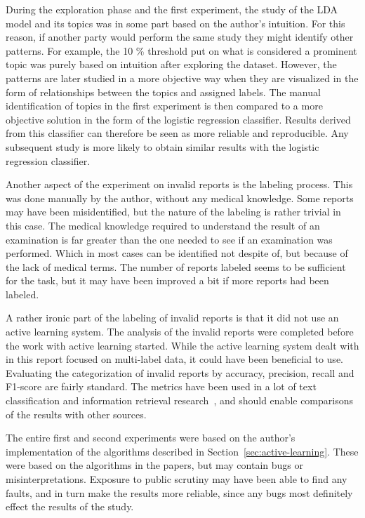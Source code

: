 During the exploration phase and the first experiment, the study of the LDA model and its topics was in some part based on the author's intuition.
For this reason, if another party would perform the same study they might identify other patterns.
For example, the 10 \% threshold put on what is considered a prominent topic was purely based on intuition after exploring the dataset.
However, the patterns are later studied in a more objective way when they are visualized in the form of relationships between the topics and assigned labels.
The manual identification of topics in the first experiment is then compared to a more objective solution in the form of the logistic regression classifier.
Results derived from this classifier can therefore be seen as more reliable and reproducible.
Any subsequent study is more likely to obtain similar results with the logistic regression classifier.

Another aspect of the experiment on invalid reports is the labeling process.
This was done manually by the author, without any medical knowledge.
Some reports may have been misidentified, but the nature of the labeling is rather trivial in this case.
The medical knowledge required to understand the result of an examination is far greater than the one needed to see if an examination was performed.
Which in most cases can be identified not despite of, but because of the lack of medical terms.
The number of reports labeled seems to be sufficient for the task, but it may have been improved a bit if more reports had been labeled.

A rather ironic part of the labeling of invalid reports is that it did not use an active learning system.
The analysis of the invalid reports were completed before the work with active learning started.
While the active learning system dealt with in this report focused on multi-label data, it could have been beneficial to use.
Evaluating the categorization of invalid reports by accuracy, precision, recall and F1-score are fairly standard.
The metrics have been used in a lot of text classification and information retrieval research~\cite{aggarwal2012surveyclass, bishop2006pattern}, and should enable comparisons of the results with other sources.

The entire first and second experiments were based on the author's implementation of the algorithms described in Section~\ref{sec:active-learning}.
These were based on the algorithms in the papers, but may contain bugs or misinterpretations.
Exposure to public scrutiny may have been able to find any faults, and in turn make the results more reliable, since any bugs most definitely effect the results of the study.

